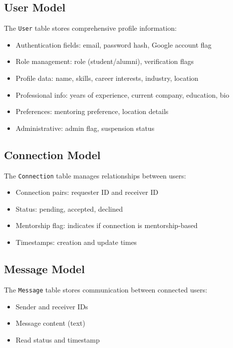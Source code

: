\documentclass[12pt,a4paper]{report}
\let\origsubsection\subsection
\renewcommand{\subsection}{\needspace{4\baselineskip}\origsubsection}
\begin{document}
\subsection{User Model}

The \texttt{User} table stores comprehensive profile information:
\begin{itemize}[noitemsep]
    \item Authentication fields: email, password hash, Google account flag
    \item Role management: role (student/alumni), verification flags
    \item Profile data: name, skills, career interests, industry, location
    \item Professional info: years of experience, current company, education, bio
    \item Preferences: mentoring preference, location details
    \item Administrative: admin flag, suspension status
\end{itemize}

\subsection{Connection Model}

The \texttt{Connection} table manages relationships between users:
\begin{itemize}[noitemsep]
    \item Connection pairs: requester ID and receiver ID
    \item Status: pending, accepted, declined
    \item Mentorship flag: indicates if connection is mentorship-based
    \item Timestamps: creation and update times
\end{itemize}

\subsection{Message Model}

The \texttt{Message} table stores communication between connected users:
\begin{itemize}[noitemsep]
    \item Sender and receiver IDs
    \item Message content (text)
    \item Read status and timestamp
\end{itemize}
\end{document}
